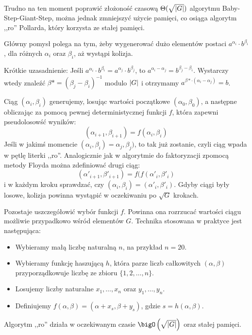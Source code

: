 Trudno na ten moment poprawić złożoność czasową \( \Theta(\sqrt{\left\lvert G\right\rvert}) \) algorytmu Baby-Step-Giant-Step, można jednak zmniejszyć użycie pamięci, co osiąga algorytm ,,ro'' Pollarda, który korzysta ze stałej pamięci.

Główny pomysł polega na tym, żeby wygenerować dużo elementów postaci \( a^{\alpha_i} \cdot b^{\beta_i} \), dla różnych \( \alpha_i \) oraz \( \beta_i \), aż wystąpi kolizja.

Krótkie uzasadnienie: Jeśli \( a^{\alpha_i} \cdot b^{\beta_i} = a^{\alpha_j} \cdot b^{\beta_j} \), to \( a^{\alpha_i - \alpha_j} = b^{\beta_j - \beta_i} \). Wystarczy wtedy znaleźć \( \beta* = (\beta_j - \beta_i)^{-1} \) modulo \( \left\lvert G\right\rvert \) i otrzymamy \( a^{\beta* \cdot (\alpha_i - \alpha_j)} = b \).

Ciąg \( (\alpha_i, \beta_i) \) generujemy, losując wartości początkowe \( (\alpha_0, \beta_0) \), a następne obliczając za pomocą pewnej deterministycznej funkcji \( f \), która zapewni pseudolosowść wyników:
\[ (\alpha_{i+1}, \beta_{i+1}) = f(\alpha_i, \beta_i) \]
Jeśli w jakimś momencie \( (\alpha_i, \beta_i) = \alpha_j, \beta_j) \), to tak już zostanie, czyli ciąg wpada w pętlę literki ,,ro''. Analogicznie jak w algorytmie do faktoryzacji zpomocą metody Floyda można zdefiniować drugi ciąg:
\[ (\alpha'_{i+1}, \beta'_{i+1}) = f(f(\alpha'_i, \beta'_i) \]
i w każdym kroku sprawdzać, czy \( (\alpha_i, \beta_i) = (\alpha'_i, \beta'_i) \). Gdyby ciągi były losowe, kolizja powinna wystąpić w oczekiwaniu po \( \sqrt{G} \) krokach.

Pozostaje uszczegółowić wybór funkcji \( f \). Powinna ona rozrzucać wartości ciągu możliwie przypadkowo wśród elementów \( G \). Technika stosowana w praktyce jest następująca:
\begin{itemize}
    \item Wybieramy małą liczbę naturalną \( n \), na przykład \( n = 20 \).
    \item Wybieramy funkcję haszującą \( h \), która parze liczb całkowitych \( (\alpha, \beta) \) przyporządkowuje liczbę ze zbioru \( \{1, 2, \dots, n\} \).
    \item Losujemy liczby naturalne \( x_1, \dots, x_n \) oraz \( y_1, \dots, y_n \).
    \item Definiujemy \( f(\alpha, \beta) = (\alpha + x_s, \beta + y_s) \), gdzie \( s = h(\alpha, \beta) \).
\end{itemize}

Algorytm ,,ro'' działa w oczekiwanym czasie \( \bigO\left(\sqrt{\abs{G}}\right) \) oraz stałej pamięci.